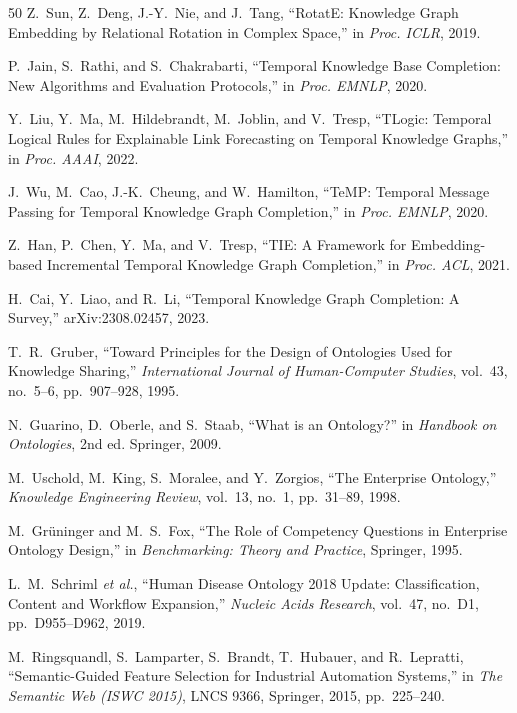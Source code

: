 \documentclass{ieeeaccess}
\begin{document}
\begin{thebibliography}{50}
Z.~Sun, Z.~Deng, J.-Y.~Nie, and J.~Tang, ``RotatE: Knowledge Graph Embedding by Relational Rotation in Complex Space,'' in \textit{Proc. ICLR}, 2019.

P.~Jain, S.~Rathi, and S.~Chakrabarti, ``Temporal Knowledge Base Completion: New Algorithms and Evaluation Protocols,'' in \textit{Proc. EMNLP}, 2020.

Y.~Liu, Y.~Ma, M.~Hildebrandt, M.~Joblin, and V.~Tresp, ``TLogic: Temporal Logical Rules for Explainable Link Forecasting on Temporal Knowledge Graphs,'' in \textit{Proc. AAAI}, 2022.

J.~Wu, M.~Cao, J.-K.~Cheung, and W.~Hamilton, ``TeMP: Temporal Message Passing for Temporal Knowledge Graph Completion,'' in \textit{Proc. EMNLP}, 2020.

Z.~Han, P.~Chen, Y.~Ma, and V.~Tresp, ``TIE: A Framework for Embedding-based Incremental Temporal Knowledge Graph Completion,'' in \textit{Proc. ACL}, 2021.

H.~Cai, Y.~Liao, and R.~Li, ``Temporal Knowledge Graph Completion: A Survey,'' arXiv:2308.02457, 2023.

T.~R.~Gruber, ``Toward Principles for the Design of Ontologies Used for Knowledge Sharing,'' \textit{International Journal of Human-Computer Studies}, vol.~43, no.~5--6, pp.~907--928, 1995.

N.~Guarino, D.~Oberle, and S.~Staab, ``What is an Ontology?'' in \textit{Handbook on Ontologies}, 2nd ed. Springer, 2009.

M.~Uschold, M.~King, S.~Moralee, and Y.~Zorgios, ``The Enterprise Ontology,'' \textit{Knowledge Engineering Review}, vol.~13, no.~1, pp.~31--89, 1998.

M.~Gr\"{u}ninger and M.~S.~Fox, ``The Role of Competency Questions in Enterprise Ontology Design,'' in \textit{Benchmarking: Theory and Practice}, Springer, 1995.

L.~M.~Schriml \textit{et al.}, ``Human Disease Ontology 2018 Update: Classification, Content and Workflow Expansion,'' \textit{Nucleic Acids Research}, vol.~47, no.~D1, pp.~D955--D962, 2019.

M.~Ringsquandl, S.~Lamparter, S.~Brandt, T.~Hubauer, and R.~Lepratti, ``Semantic-Guided Feature Selection for Industrial Automation Systems,'' in \textit{The Semantic Web (ISWC 2015)}, LNCS 9366, Springer, 2015, pp.~225--240.


\end{thebibliography}
\end{document}
